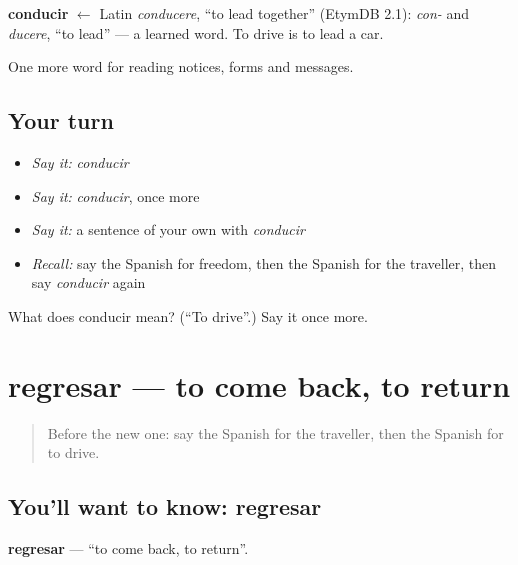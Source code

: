 \begin{cousinweb}
\textbf{conducir} $\leftarrow$ Latin \emph{conducere}, \textquotedblleft{}to lead together\textquotedblright{} (EtymDB 2.1): \emph{con-} and \emph{ducere}, \textquotedblleft{}to lead\textquotedblright{} — a learned word. To drive is to lead a car.
\end{cousinweb}

\begin{grammarlens}[title={What you've built}]
One more word for reading notices, forms and messages.
\end{grammarlens}

\subsection*{Your turn}
\begin{itemize}
\raggedright
  \item \emph{Say it:} \emph{conducir}
  \item \emph{Say it:} \emph{conducir}, once more
  \item \emph{Say it:} a sentence of your own with \emph{conducir}
  \item \emph{Recall:} say the Spanish for freedom, then the Spanish for the traveller, then say \emph{conducir} again
\end{itemize}

\begin{tcolorbox}[breakable,colback=teal!4,colframe=teal!35!black,title={Before you move on}]
What does conducir mean? (\textquotedblleft{}To drive\textquotedblright{}.) Say it once more.
\end{tcolorbox}
\section[regresar]{regresar — to come back, to return}

\label{lesson:ES-C501-regresar}



\begin{quote}
Before the new one: say the Spanish for the traveller, then the Spanish for to drive.
\end{quote}

\subsection*{You'll want to know: regresar}
\textbf{regresar} — \textquotedblleft{}to come back, to return\textquotedblright{}.

